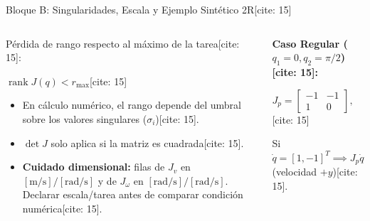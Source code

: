 \documentclass[aspectratio=169, xcolor={table,xcdraw}]{beamer}
\begin{document}
\begin{frame}{Bloque B: Singularidades, Escala y Ejemplo Sintético 2R[cite: 15]}
    \begin{columns}[T]
        \begin{column}{0.48\textwidth}
            \begin{tcolorbox}[colback=yellow!10, colframe=orange, title=\textbf{Criterio de Rango y Escala} {[cite: 15]}, boxsep=0.8mm, top=1mm, bottom=1mm]
                \scriptsize\raggedright
                Pérdida de rango respecto al máximo de la tarea[cite: 15]:
                \begin{center}
                    $\boxed{ \operatorname{rank}J(q) < r_{\max} }$[cite: 15]
                \end{center}
                \begin{itemize}\setlength{\itemsep}{1pt}
                    \item En cálculo numérico, el rango depende del umbral sobre los valores singulares ($\sigma_i$)[cite: 15].
                    \item $\det J$ solo aplica si la matriz es cuadrada[cite: 15].
                    \item \textbf{Cuidado dimensional:} filas de $J_v$ en $[\mathrm{m/s}]/[\mathrm{rad/s}]$ y de $J_\omega$ en $[\mathrm{rad/s}]/[\mathrm{rad/s}]$. Declarar escala/tarea antes de comparar condición numérica[cite: 15].
                \end{itemize}
            \end{tcolorbox}
        \end{column}
        \begin{column}{0.48\textwidth}
            \begin{tcolorbox}[colback=white, colframe=ucbblue, title=\textbf{Ejemplo Sintético 2R Unitario} {[cite: 15]}, boxsep=0.8mm, top=1mm, bottom=1mm]
                \scriptsize\raggedright
                \textbf{Caso Regular ($q_1=0, q_2=\pi/2$)[cite: 15]:}
                \begin{center}
                    $J_p = \begin{bmatrix} -1 & -1 \\ 1 & 0 \end{bmatrix}, \quad \det J_p = 1$[cite: 15]
                \end{center}
                Si $\dot{q}=[1,-1]^T \implies J_p\dot{q}=[0,1]^T$ (velocidad $+y$)[cite: 15].
                \vspace{0.1cm}

\end{tcolorbox}
\end{column}
\end{columns}
\end{frame}
\end{document}
